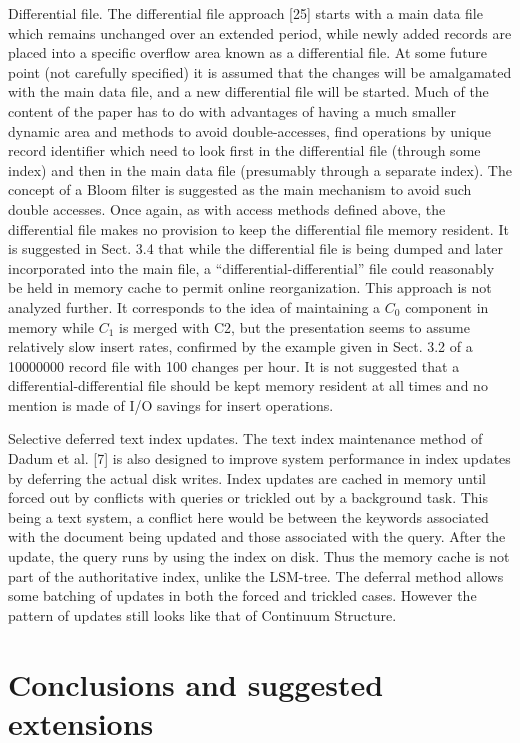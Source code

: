 \documentclass[a4paper,12pt,notitlepage,twoside,openright]{article}
\begin{document}
Differential file. The differential file approach {[}25{]} starts with a
main data file which remains unchanged over an extended period, while
newly added records are placed into a specific overflow area known as a
differential file. At some future point (not carefully specified) it is
assumed that the changes will be amalgamated with the main data file,
and a new differential file will be started. Much of the content of the
paper has to do with advantages of having a much smaller dynamic area
and methods to avoid double-accesses, find operations by unique record
identifier which need to look first in the differential file (through
some index) and then in the main data file (presumably through a
separate index). The concept of a Bloom filter is suggested as the main
mechanism to avoid such double accesses. Once again, as with access
methods defined above, the differential file makes no provision to keep
the differential file memory resident. It is suggested in Sect. 3.4 that
while the differential file is being dumped and later incorporated into
the main file, a ``differential-differential'' file could reasonably be
held in memory cache to permit online reorganization. This approach is
not analyzed further. It corresponds to the idea of maintaining a \(C_0\)
component in memory while \(C_1\) is merged with C2, but the presentation
seems to assume relatively slow insert rates, confirmed by the example
given in Sect. 3.2 of a 10000000 record file with 100 changes per hour.
It is not suggested that a differential-differential file should be kept
memory resident at all times and no mention is made of I/O savings for
insert operations.

Selective deferred text index updates. The text index maintenance method
of Dadum et al. {[}7{]} is also designed to improve system performance
in index updates by deferring the actual disk writes. Index updates are
cached in memory until forced out by conflicts with queries or trickled
out by a background task. This being a text system, a conflict here
would be between the keywords associated with the document being updated
and those associated with the query. After the update, the query runs by
using the index on disk. Thus the memory cache is not part of the
authoritative index, unlike the LSM-tree. The deferral method allows
some batching of updates in both the forced and trickled cases. However
the pattern of updates still looks like that of Continuum Structure.


\hypertarget{conclusions-and-suggested-extensions}{%
\section{Conclusions and suggested
extensions}\label{conclusions-and-suggested-extensions}}
\end{document}
